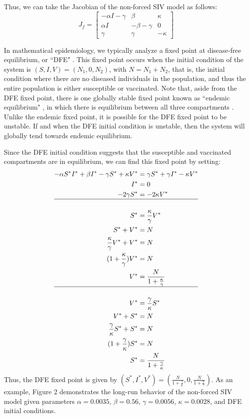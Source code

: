 \documentclass[12pt]{article}
\begin{document}
Thus, we can take the Jacobian of the non-forced SIV model as follows:
$$
J_f = \begin{bmatrix}
-\alpha I - \gamma & \beta & \kappa \\
\alpha I & -\beta - \gamma & 0 \\
\gamma & \gamma & -\kappa
\end{bmatrix}
$$

In mathematical epidemiology, we typically analyze a fixed point at disease-free equilibrium, or ``DFE" \citep{doi:10.1093/bmb/ldp038}. This fixed point occurs when the initial condition of the system is $(S, I, V) = (N_1, 0, N_2)$,  with $N = N_1 + N_2$, that is, the initial condition where there are no diseased individuals in the population, and thus the entire population is either susceptible or vaccinated. Note that, aside from the DFE fixed point, there is one globally stable fixed point known as ``endemic equilibrium" , in which there is equilibrium between all three compartments \citep{sun2010global}. Unlike the endemic fixed point, it is possible for the DFE fixed point to be unstable. If and when the DFE initial condition is unstable, then the system will globally tend towards endemic equilibrium.

Since the DFE initial condition suggests that the susceptible and vaccinated compartments are in equilibrium, we can find this fixed point by setting:
$$
\begin{aligned}
-\alpha S^* I^* + \beta I^* - \gamma S^* + \kappa V^* &= \gamma S^* + \gamma I^* - \kappa V^* \\
I^* &= 0 \\
 - 2 \gamma S^* &= - 2 \kappa V^* \\
 \hline \\
 S^* &= \frac{\kappa}{\gamma}V^* \\
 S^* + V^* &= N \\
 \frac{\kappa}{\gamma}V^* + V^* &= N \\
 (1 + \frac{\kappa}{\gamma})V^* &= N \\
 V^* &= \frac{N}{1 + \frac{\kappa}{\gamma}} \\
 \hline \\
 V^* &= \frac{\gamma}{\kappa}S^* \\
 V^* + S^* &= N \\
 \frac{\gamma}{\kappa}S^* + S^* &= N \\
 (1 + \frac{\gamma}{\kappa})S^* &= N \\
 S^* &= \frac{N}{1 + \frac{\gamma}{\kappa}}
\end{aligned}
$$
Thus, the DFE fixed point is given by $(S^*, I^*, V^*) = (\frac{N}{1 + \frac{\gamma}{\kappa}}, 0, \frac{N}{1 + \frac{\kappa}{\gamma}})$. As an example, Figure 2 demonstrates the long-run behavior of the non-forced SIV model given parameters $\alpha = 0.0035$, $\beta = 0.56$, $\gamma = 0.0056$, $\kappa = 0.0028$, and DFE initial conditions.
\end{document}
